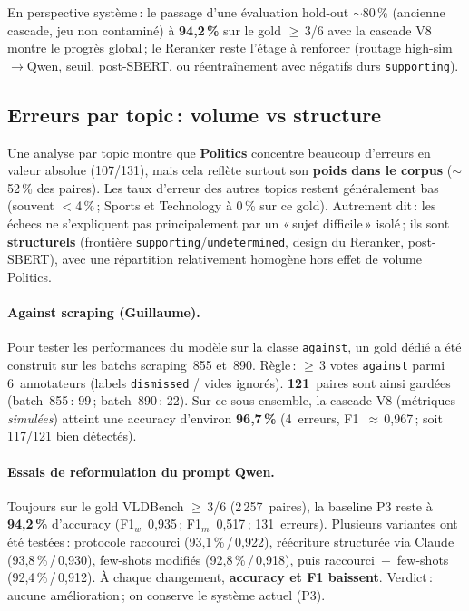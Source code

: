 En perspective système\,: le passage d'une évaluation hold-out $\sim$80\,\% (ancienne cascade, jeu non contaminé) à \textbf{94{,}2\,\%} sur le gold $\ge$\,3/6 avec la cascade V8 montre le progrès global\,; le Reranker reste l'étage à renforcer (routage high-sim$\to$Qwen, seuil, post-SBERT, ou réentraînement avec négatifs durs \texttt{supporting}).

\subsection*{Erreurs par topic\,: volume vs structure}

Une analyse par topic montre que \textbf{Politics} concentre beaucoup d'erreurs en valeur absolue (107/131), mais cela reflète surtout son \textbf{poids dans le corpus} ($\sim$52\,\% des paires). Les taux d'erreur des autres topics restent généralement bas (souvent $<$4\,\%\,; Sports et Technology à 0\,\% sur ce gold). Autrement dit\,: les échecs ne s'expliquent pas principalement par un «\,sujet difficile\,» isolé\,; ils sont \textbf{structurels} (frontière \texttt{supporting}/\texttt{undetermined}, design du Reranker, post-SBERT), avec une répartition relativement homogène hors effet de volume Politics.

\paragraph{Against scraping (Guillaume).}
Pour tester les performances du modèle sur la classe \texttt{against}, un gold dédié a été construit sur les batchs scraping~855 et~890. Règle\,: $\ge$\,3 votes \texttt{against} parmi 6~annotateurs (labels \texttt{dismissed} / vides ignorés). \textbf{121}~paires sont ainsi gardées (batch~855\,: 99\,; batch~890\,: 22). Sur ce sous-ensemble, la cascade V8 (métriques \emph{simulées}) atteint une accuracy d'environ \textbf{96{,}7\,\%} (4~erreurs, F1~$\approx$\,0{,}967\,; soit 117/121 bien détectés).

\paragraph{Essais de reformulation du prompt Qwen.}
Toujours sur le gold VLDBench $\ge$\,3/6 (2\,257~paires), la baseline P3 reste à \textbf{94{,}2\,\%} d'accuracy (F1$_w$~0{,}935\,; F1$_m$~0{,}517\,; 131~erreurs). Plusieurs variantes ont été testées\,: protocole raccourci (93{,}1\,\%\,/\,0{,}922), réécriture structurée via Claude (93{,}8\,\%\,/\,0{,}930), few-shots modifiés (92{,}8\,\%\,/\,0{,}918), puis raccourci~+~few-shots (92{,}4\,\%\,/\,0{,}912). À chaque changement, \textbf{accuracy et F1 baissent}. Verdict\,: aucune amélioration\,; on conserve le système actuel (P3).

